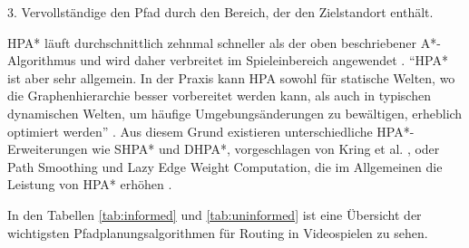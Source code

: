 3. Vervollständige den Pfad durch den Bereich, der den Zielstandort enthält.\\

\begin{sloppypar}
HPA* läuft durchschnittlich zehnmal schneller als der oben beschriebener A*-Algorithmus \cite[S. 1, 26]{Bot04} und wird daher verbreitet im Spieleinbereich angewendet \cite{LSC08}. ``HPA* ist aber sehr allgemein. In der Praxis kann HPA sowohl für statische Welten, wo die Graphenhierarchie besser vorbereitet werden kann, als auch in typischen dynamischen Welten, um häufige Umgebungsänderungen zu bewältigen, erheblich optimiert werden'' \cite[S.39]{Kri10}. Aus diesem Grund existieren unterschiedliche HPA*-Erweiterungen wie SHPA* und DHPA*, vorgeschlagen von Kring et al. \cite[S.40ff.]{Kri10}, oder Path Smoothing und Lazy Edge Weight Computation, die im Allgemeinen die Leistung von HPA* erhöhen \cite{JB07}.
\end{sloppypar}

In den Tabellen \ref{tab:informed} und \ref{tab:uninformed} ist eine Übersicht der wichtigsten Pfadplanungsalgorithmen für Routing in Videospielen zu sehen.


